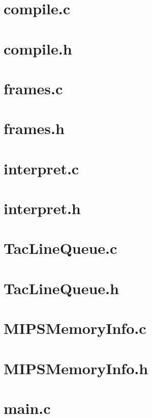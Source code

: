 \documentclass{article}
\begin{document}
	
\section{compile.c}

\section{compile.h}

\section{frames.c}

\section{frames.h}

\section{interpret.c}

\section{interpret.h}

\section{TacLineQueue.c}

\section{TacLineQueue.h}

\section{MIPSMemoryInfo.c}

\section{MIPSMemoryInfo.h}

\section{main.c}



	
\end{document}

